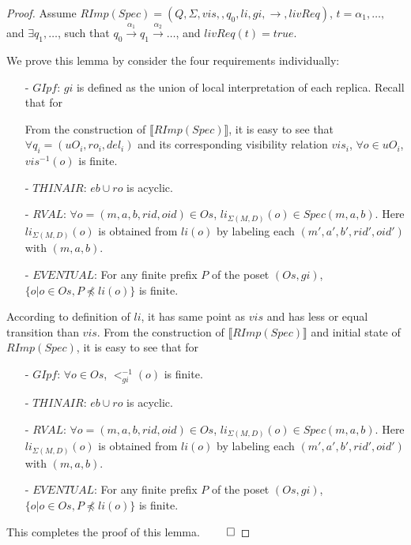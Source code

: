\begin {proof} 

Assume $RImp(Spec) = (Q,\Sigma,vis,,q_0,li,gi,\rightarrow,livReq)$, $t = \alpha_1, \ldots, $ and $\exists q_1,\ldots$, such that $q_0 {\xrightarrow{\alpha_1}} q_1 {\xrightarrow{\alpha_2}} \ldots$, and $livReq(t) = \textit{true}$.

We prove this lemma by consider the four requirements individually: 

\begin{itemize}
\setlength{\itemsep}{0.5pt}
\item[-] $\textit{GIpf}$: $gi$ is defined as the union of local interpretation of each replica. Recall that for 

From the construction of $\llbracket RImp(Spec) \rrbracket$, it is easy to see that $\forall q_i = (uO_i,ro_i,del_i)$ and its corresponding visibility relation $vis_i$, $\forall o \in uO_i$, $vis^{-1}(o)$ is finite.
    

\item[-] $\textit{THINAIR}$: $eb \cup ro$ is acyclic.

\item[-] $\textit{RVAL}$: $\forall o = (m,a,b,rid,oid) \in Os$, $li_{\Sigma(M,D)}(o) \in Spec(m,a,b)$. Here $li_{\Sigma(M,D)}(o)$ is obtained from $li(o)$ by labeling each $(m',a',b',rid',oid')$ with $(m,a,b)$.

\item[-] $\textit{EVENTUAL}$: For any finite prefix $P$ of the poset $(Os,gi)$, $\{ o \vert o \in Os, P \npreceq li(o) \}$ is finite.
\end{itemize}




According to definition of $li$, it has same point as $vis$ and has less or equal transition than $vis$. From the construction of $\llbracket RImp(Spec) \rrbracket$ and initial state of $RImp(Spec)$, it is easy to see that for

\begin{itemize}
\setlength{\itemsep}{0.5pt}
\item[-] $\textit{GIpf}$: $\forall o \in Os$, $<^{-1}_{gi}(o)$ is finite.

\item[-] $\textit{THINAIR}$: $eb \cup ro$ is acyclic.

\item[-] $\textit{RVAL}$: $\forall o = (m,a,b,rid,oid) \in Os$, $li_{\Sigma(M,D)}(o) \in Spec(m,a,b)$. Here $li_{\Sigma(M,D)}(o)$ is obtained from $li(o)$ by labeling each $(m',a',b',rid',oid')$ with $(m,a,b)$.

\item[-] $\textit{EVENTUAL}$: For any finite prefix $P$ of the poset $(Os,gi)$, $\{ o \vert o \in Os, P \npreceq li(o) \}$ is finite.
\end{itemize}

This completes the proof of this lemma. $\qed$
\end {proof}



